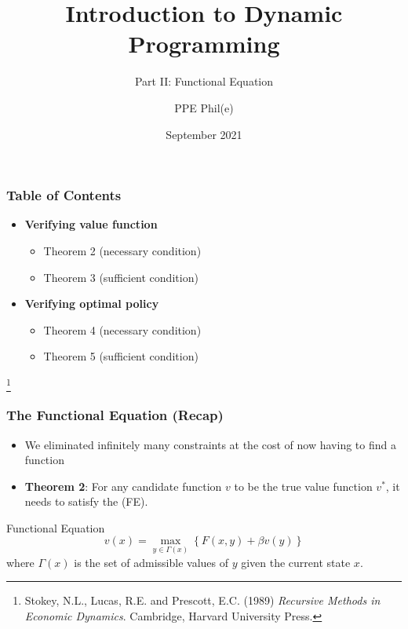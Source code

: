 \documentclass[aspectratio=169]{beamer}
\title[Dynamic Programming Part II] %
{Introduction to Dynamic Programming}
\subtitle{Part II: Functional Equation}
\author[PPE Phil(e)]
{PPE Phil(e)\inst{1}}
\institute[] %
{
  \inst{1}%
  material @ https://github.com/PPEphile
}
\date[2021] %
{September 2021}
\newcommand\blfootnote[1]{%
\begingroup
\renewcommand\thefootnote{}\footnote{#1}%
\addtocounter{footnote}{-1}%
\endgroup
}
\begin{document}
\frame{\titlepage}

\begin{frame}
\frametitle{Table of Contents}
\begin{itemize}
\item \textbf{Verifying \color{magenta} value function}
\begin{itemize}
\item \color{black} Theorem 2 (necessary condition)
\item Theorem 3 (sufficient condition)
\end{itemize}
\item \textbf{Verifying \color{blue}optimal policy}
\begin{itemize}
\item \color{black} Theorem 4 (necessary condition)
\item Theorem 5 (sufficient condition)
\end{itemize}
\end{itemize}

\blfootnote{Stokey, N.L., Lucas, R.E. and Prescott, E.C. (1989) \textit{Recursive Methods in Economic Dynamics}. Cambridge, Harvard University Press.}

\end{frame}

\begin{frame}
\frametitle{The Functional Equation (Recap)}
\begin{itemize}
\item We eliminated infinitely many constraints at the cost of now having to find a function
\item \textbf{Theorem 2}: For any candidate function $v$ to be the true value function $v^*$, it needs to satisfy the (FE).
\end{itemize}
\begin{block}{Functional Equation}
\begin{equation}
v(x) = \max_{y \in \Gamma(x)} \left\lbrace F(x, y) + \beta v(y) \right\rbrace \tag{FE}
\end{equation}
where $\Gamma(x)$ is the set of admissible values of $y$ given the current state $x$.
\end{block}

\end{frame}
\end{document}
